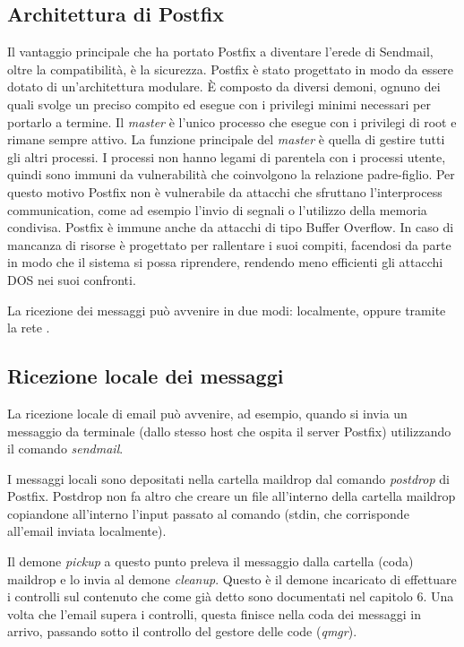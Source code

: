   \subsection{Architettura di Postfix}
  Il vantaggio principale che ha portato Postfix a diventare l’erede di Sendmail, oltre la compatibilità, 
  è la sicurezza. Postfix è stato progettato in modo da essere dotato di un’architettura modulare. 
  È composto da diversi demoni, ognuno dei quali svolge un preciso compito ed esegue con i privilegi minimi 
  necessari per portarlo a termine. Il  \textit{master} è l’unico processo che esegue con i privilegi di root
  e rimane sempre attivo. 
  La funzione principale del \textit{master} è quella di gestire tutti gli altri processi. 
  I processi non hanno legami di parentela con i processi utente, quindi sono immuni da vulnerabilità che 
  coinvolgono la relazione padre-figlio. Per questo motivo Postfix non è vulnerabile da attacchi che sfruttano 
  l’interprocess communication, come ad esempio l’invio di segnali o l’utilizzo della memoria condivisa. 
  Postfix è immune anche da attacchi di tipo Buffer Overflow. 
  In caso di mancanza di risorse è progettato per rallentare i suoi compiti, facendosi da parte in modo che 
  il sistema si possa riprendere, rendendo meno efficienti gli attacchi DOS nei suoi confronti.
  
  La ricezione dei messaggi può avvenire in due modi: localmente, oppure tramite la rete \cite{hildebrandt2005book}.
  
  \subsection{Ricezione locale dei messaggi}\label{sec:ricezioneLocale}
  La ricezione locale di email può avvenire, ad esempio, quando si invia un messaggio da terminale 
  (dallo stesso host che ospita il server Postfix) utilizzando il comando \textit{sendmail}. 
  
  I messaggi locali sono depositati nella cartella maildrop dal comando \textit{postdrop} di Postfix. 
  Postdrop non fa altro che creare un file all’interno della cartella maildrop copiandone all’interno 
  l’input passato al comando (stdin, che corrisponde all'email inviata localmente). 
  
  Il demone \textit{pickup} a questo punto preleva il messaggio dalla cartella (coda) maildrop e lo 
  invia al demone \textit{cleanup}. 
  Questo è il demone incaricato di effettuare i controlli sul contenuto che come già detto sono documentati 
  nel capitolo 6. 
  Una volta che l’email supera i controlli, questa finisce nella coda dei messaggi in arrivo, passando 
  sotto il controllo del gestore delle code (\textit{qmgr}). 

